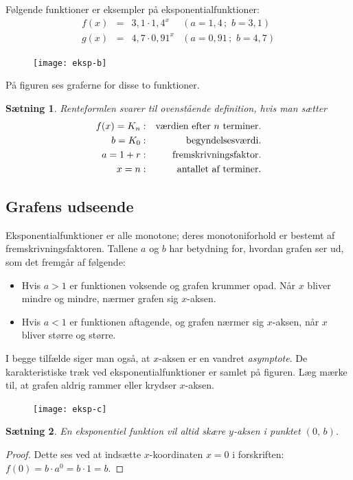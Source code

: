 \documentclass[12pt,oneside,a4paper]{article}
\newcommand{\bas}{\begin{eqnarray*}}
\newcommand{\eas}{\end{eqnarray*}}
\theoremstyle{plain}
\newtheorem*{thm}{Sætning}
\begin{document}
Følgende funktioner er eksempler på eksponentialfunktioner:
$$
\begin{array}{rcll}
    f(x) &=& 3,1 \cdot 1,4^x & ( a=1,4  \, ; \, \, b=3,1) \\
    g(x) &=& 4,7 \cdot 0,91^x & (a=0,91 \, ; \, \, b=4,7) 
\end{array}
$$

\begin{figure}[ht]
    \centering
    \texttt{[image: eksp-b]}
    \label{eksp-b}
\end{figure}
På figuren ses graferne for disse to funktioner.

\begin{thm}
    Renteformlen svarer til ovenstående definition, hvis man sætter
    \bas
    f(x) = K_n & : & \hbox{værdien efter $n$ terminer.} \\
       b = K_0 & : & \hbox{begyndelsesværdi.} \\
       a = 1+r & : & \hbox{fremskrivningsfaktor.} \\
       x = n   & : & \hbox{antallet af terminer.}
    \eas
\end{thm}

\subsection*{Grafens udseende}
Eksponentialfunktioner er alle monotone; deres monotoniforhold er bestemt af
fremskrivningsfaktoren. Tallene $a$ og $b$ har betydning for, hvordan grafen
ser ud, som det fremgår af følgende:

\begin{itemize}
    \item Hvis $a>1$ er funktionen voksende og grafen krummer opad.
        Når $x$ bliver mindre og mindre, nærmer grafen
        sig $x$-aksen.
    \item Hvis $a<1$ er funktionen aftagende, og grafen nærmer sig
        $x$-aksen, når $x$ bliver større og større.
\end{itemize}

I begge tilfælde siger man også, at $x$-aksen er en vandret {\em asymptote}.
De karakteristiske træk ved eksponentialfunktioner er samlet på figuren.  Læg
mærke til, at grafen aldrig rammer eller krydser $x$-aksen.

\begin{figure}[ht]
    \centering
    \texttt{[image: eksp-c]}
    \label{eksp-c}
\end{figure}

\begin{thm}
    En eksponentiel funktion vil altid skære $y$-aksen i punktet $(0,\,b)$.
\end{thm}
\begin{proof}
    Dette ses ved at indsætte $x$-koordinaten $x=0$ i forskriften:
    $f(0) = b\cdot a^0 = b\cdot 1 = b$.
\end{proof}
\end{document}
